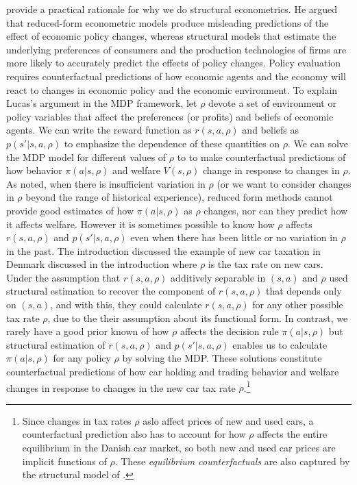 \citet{lucas:1976} provide a practical rationale for why we do structural econometrics. 
He  argued that reduced-form econometric models produce misleading predictions of the effect of
economic policy changes, whereas structural models that estimate the underlying preferences of consumers
and the production technologies of firms are more likely to accurately predict the effects of 
policy changes. Policy evaluation requires counterfactual predictions of how 
economic agents and the economy will react to changes in economic policy and the economic environment.
To explain Lucas's argument in the MDP framework, let $\rho$ devote a set of environment
or policy variables that affect the preferences (or profits) and beliefs of economic agents. We can
write the reward function as $r(s,a,\rho)$ and beliefs as $p(s'|s,a,\rho)$ to emphasize the dependence
of these quantities on $\rho$. We can solve the MDP model for different values of $\rho$ to 
to make counterfactual predictions of how behavior $\pi(a|s,\rho)$ and welfare $V(s,\rho)$ change in response
to changes in $\rho$. As noted, when there is insufficient variation in $\rho$ (or we want to consider changes in $\rho$
beyond the range of historical experience), reduced form methods cannot provide good estimates of how $\pi(a|s,\rho)$
as $\rho$ changes, nor can they predict how it affects welfare. However it is sometimes possible to know how $\rho$ affects $r(s,a,\rho)$ 
and $p(s'|s,a,\rho)$ even when there has been little or no variation in $\rho$ in the past. The introduction discussed the 
example of new car taxation in Denmark discussed in the introduction where $\rho$ is the tax rate on new cars. 
Under the assumption that  $r(s,a,\rho)$ additively separable in $(s,a)$ and
$\rho$ \cite{GIMRS:2022} used structural estimation to recover the component of $r(s,a,\rho)$ that depends
only on $(s,a)$, and with this, they could calculate  $r(s,a,\rho)$ for any other possible tax rate $\rho$, due to the
their assumption about its functional form. In contrast, we rarely have a good prior
known of how $\rho$ affects the decision rule  $\pi(a|s,\rho)$ 
but structural estimation of $r(s,a,\rho)$ and $p(s'|s,a,\rho)$ enables us to calculate $\pi(a|s,\rho)$  for any policy $\rho$
by solving the MDP. These solutions constitute  counterfactual predictions of how car holding and trading behavior and welfare
changes in response to changes in the new car tax rate $\rho$.\footnote{\footnotesize Since changes in tax rates $\rho$ aslo affect prices
of new and used cars, a counterfactual prediction also has to account for how $\rho$ affects the entire equilibrium
in the Danish car market, so both new and used car prices are implicit functions of $\rho$. These {\it equilibrium
counterfactuals\/} are also captured by the structural model of \citet{GIMRS:2022}.}

